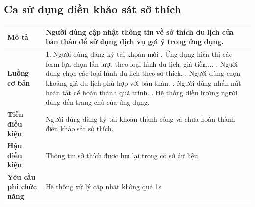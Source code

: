 \subsection{Ca sử dụng điền khảo sát sở thích}
\vspace{0.5cm}


\noindent 
\begin{tabularx}{\linewidth}{| l | X |} 
\hline 
\textbf{Mô tả} & Người dùng cập nhật thông tin về sở thích du lịch của bản thân để sử dụng dịch vụ gợi ý trong ứng dụng. \\ 
\hline 
\textbf{Luồng cơ bản} & 1. Người dùng đăng ký tài khoản mới \newline
                       2. Ứng dụng hiển thị các form lựa chọn lần lượt theo loại hình du lịch, giá tiền,... \newline
                       3. Người dùng chọn các loại hình du lịch theo sở thích. \newline
                       5. Người dùng chọn khoảng giá du lịch phù hợp với bản thân. \newline
                       6. Người dùng nhấn nút hoàn tất để hoàn thành quá trình. \newline
                       7. Hệ thống điều hướng người dùng đến trang chủ của ứng dụng. \\
\hline 
\textbf{Tiền điều kiện} & Người dùng đăng ký tài khoản thành công và chưa hoàn thành điền khảo sát sở thích. \\
\hline 
\textbf{Hậu điều kiện} & Thông tin sở thích được lưu lại trong cơ sở dữ liệu. \\

\hline 
\textbf{Yêu cầu phi chức năng} & Hệ thống xử lý cập nhật không quá 1s \\ 
\hline 
\end{tabularx}

\vspace{0.8cm}

